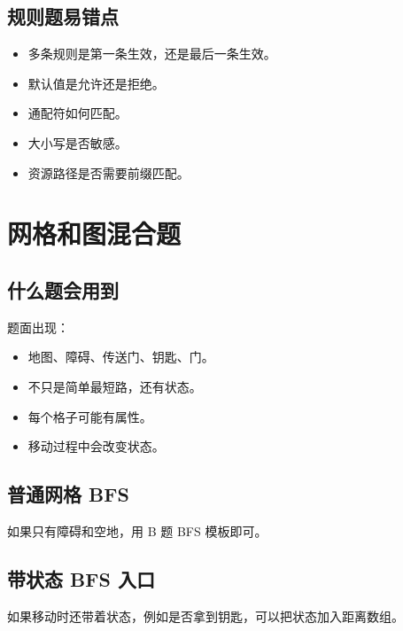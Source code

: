 \subsection{规则题易错点}

\begin{itemize}
  \item 多条规则是第一条生效，还是最后一条生效。
  \item 默认值是允许还是拒绝。
  \item 通配符如何匹配。
  \item 大小写是否敏感。
  \item 资源路径是否需要前缀匹配。
\end{itemize}

\section{网格和图混合题}\label{sec:07-28}

\subsection{什么题会用到}

题面出现：

\begin{itemize}
  \item 地图、障碍、传送门、钥匙、门。
  \item 不只是简单最短路，还有状态。
  \item 每个格子可能有属性。
  \item 移动过程中会改变状态。
\end{itemize}

\subsection{普通网格 BFS}

如果只有障碍和空地，用 B 题 BFS 模板即可。

\subsection{带状态 BFS 入口}

如果移动时还带着状态，例如是否拿到钥匙，可以把状态加入距离数组。

